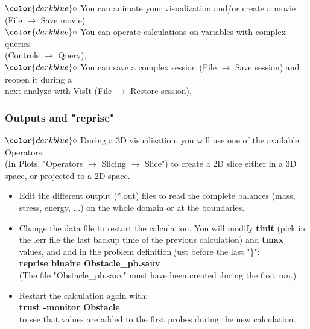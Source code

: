 \documentclass[10pt]{beamer}
\begin{document}
\begin{frame}
\begin{block}{}
\hspace{1cm} $\color{darkblue}\circ$ {\small{You can animate your visualization and/or create a movie (File $\rightarrow$ Save movie)}}\\

\hspace{1cm} $\color{darkblue}\circ$ {\small{You can operate calculations on variables with complex queries \\
\hspace{1.3cm} (Controls $\rightarrow$ Query),}}\\

\hspace{1cm} $\color{darkblue}\circ$ {\small{You can save a complex session (File $\rightarrow$ Save session) and reopen it during a \\
\hspace{1.3cm} next analyze with VisIt (File $\rightarrow$ Restore session),}}



\end{block}
\end{frame}
\begin{frame}
\frametitle{Outputs and "reprise"}
\begin{block}{}

\hspace{1cm} $\color{darkblue}\circ$ {\small{During a 3D visualization, you will use one of the available Operators \\
\hspace{1.3cm} (In Plots, "Operators $\rightarrow$ Slicing $\rightarrow$ Slice") to create a 2D slice either in a 3D \\
\hspace{1.3cm} space, or projected to a 2D space.}}

\begin{itemize}
\item Edit the different output (*.out) files to read the complete balances (mass, stress, energy, ...) on the whole domain or at the boundaries.
\vspace{0.3cm}
\item  Change the data file to restart the calculation. You will modify \textbf{tinit} (pick in the .err file the last backup time of the previous calculation) and \textbf{tmax} values, and add in the problem definition just before the last "\}":\\
\textbf{reprise binaire Obstacle\_pb.sauv}\\
(The file "Obstacle\_pb.sauv" must have been created during the first run.)
\vspace{0.3cm}
\item Restart the calculation again with:\\
\textbf{trust -monitor Obstacle}\\
to see that values are added to the first probes during the new calculation.
\end{itemize}

\end{block}
\end{frame}
\end{document}
